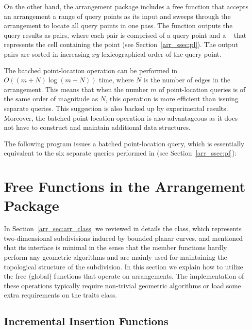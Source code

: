 On the other hand, the arrangement package includes a free
 function that accepts an arrangement a range of
query points as its input and sweeps through the arrangement to
locate all query points in one pass. The function outputs the query
results as pairs, where each pair is comprised of a query point
and a \cgal\  that represents the cell containing the
point (see Section~\ref{arr_ssec:pl}). The output pairs are
sorted in increasing $xy$-lexicographical order of the query point.

The batched point-location operation can be performed in
$O\left((m+N)\log{(m+N)}\right)$ time, where $N$ is the number of
edges in the arrangement. This means that when the number $m$ of
point-location queries is of the same order of magnitude as $N$,
this operation is more efficient than issuing separate queries.
This suggestion is also backed up by experimental results.
Moreover, the batched point-location operation is also
advantageous as it does not have to construct and maintain
additional data structures.

The following program issues a batched point-location query, which
is essentially equivalent to the six separate queries performed in
 (see Section~\ref{arr_ssec:pl}):


\section{Free Functions in the Arrangement Package}
\label{arr_sec:gl_funcs}
%
In Section~\ref{arr_sec:arr_class} we reviewed in details the
 class, which represents two-dimensional
subdivisions induced by bounded planar curves, and mentioned that its
interface is minimal in the sense that the member functions hardly
perform any geometric algorithms and are mainly used for
maintaining the topological structure of the subdivision. In this
section we explain how to utilize the free (global) functions that operate
on arrangements. The implementation of these operations typically require
non-trivial geometric algorithms or load some extra requirements on
the traits class.

\subsection{Incremental Insertion Functions}
\label{arr_ssec:inc_insert}
%
